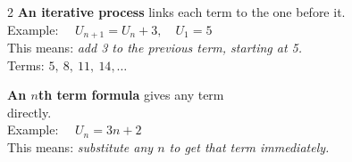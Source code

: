 \documentclass[12pt,a4paper]{article}
\begin{document}
\begin{tcolorbox}[
  colback=white, colframe=headgrey,
  sharp corners, title={\bfseries Key Ideas},
  fonttitle=\small\bfseries, coltitle=white, colbacktitle=headgrey,
  top=6pt, bottom=6pt, left=8pt, right=8pt
]
\small
\begin{multicols}{2}
\textbf{An iterative process} links each term to the one before it.\\
Example: $\quad U_{n+1} = U_n + 3, \quad U_1 = 5$\\
This means: \emph{add 3 to the previous term, starting at 5.}\\
Terms: $5,\ 8,\ 11,\ 14, \ldots$

\columnbreak

\textbf{An $n$th term formula} gives any term \\ directly.\\
Example: $\quad U_n = 3n + 2$\\
This means: \emph{substitute any $n$ to get that term immediately.}\\
\end{multicols}




\end{tcolorbox}

\vspace{14pt}
\end{document}
